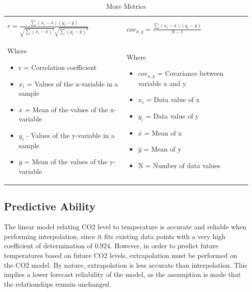 \documentclass[12pt]{mcmthesis}
\begin{document}
    \begin{table}
        \begin{tabular}{|*2{p{}|}}
            \hline & \\
            \quad ${\displaystyle r={\frac {\sum (x_{i}-{\bar {x}})(y_{i}-{\bar {y}})}{{\sqrt {\sum (x_{i}-{\bar {x}})^{2}}}{\sqrt {\sum (y_{i}-{\bar {y}})^{2}}}}}}$ & ${\displaystyle cov_{x,y}={\frac {\sum (x_{i}-{\bar {x}})(y_{i}-{\bar {y}})}{{N-1}}}}$\\[\baselineskip]
            Where
            \begin{itemize}[nosep]
                \item {r} = Correlation coefficient
                \item ${x_i}$ = Values of the x-variable in a sample
                \item ${\overline x}$ = Mean of the values of the x-variable
                \item ${y_i}$ - Values of the y-variable in a sample
                \item ${\overline y}$ = Mean of the values of the y-variable
            \end{itemize}
            &
            Where
            \begin{itemize}[nosep]
                \item ${cov_{x,y}}$ = Covariance between variable x and y
                \item ${x_i}$ = Data value of x
                \item ${y_i}$ = Data value of y
                \item ${\bar{x}}$ = Mean of x
                \item ${\bar{y}}$ = Mean of y
                \item {N} = Number of data values
            \end{itemize}
            \\
            \hline
        \end{tabular}
        \caption{More Metrics}
        \label{tab:mm}
    \end{table}

    \subsection{Predictive Ability}

    The linear model relating CO2 level to temperature is accurate and reliable when performing interpolation, since it fits existing data points with a very high coefficient of determination of 0.924. However, in order to predict future temperatures based on future CO2 levels, extrapolation must be performed on the CO2 model. By nature, extrapolation is less accurate than interpolation. This implies a lower forecast reliability of the model, as the assumption is made that the relationships remain unchanged.
\end{document}
